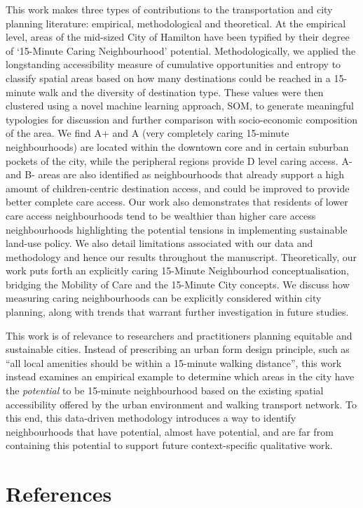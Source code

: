 \documentclass[
  authoryear,
  preprint,
  3p]{elsarticle}
\begin{document}
This work makes three types of contributions to the transportation and
city planning literature: empirical, methodological and theoretical. At
the empirical level, areas of the mid-sized City of Hamilton have been
typified by their degree of `15-Minute Caring Neighbourhood' potential.
Methodologically, we applied the longstanding accessibility measure of
cumulative opportunities and entropy to classify spatial areas based on
how many destinations could be reached in a 15-minute walk and the
diversity of destination type. These values were then clustered using a
novel machine learning approach, SOM, to generate meaningful typologies
for discussion and further comparison with socio-economic composition of
the area. We find A+ and A (very completely caring 15-minute
neighbourhoods) are located within the downtown core and in certain
suburban pockets of the city, while the peripheral regions provide D
level caring access. A- and B- areas are also identified as
neighbourhoods that already support a high amount of children-centric
destination access, and could be improved to provide better complete
care access. Our work also demonstrates that residents of lower care
access neighbourhoods tend to be wealthier than higher care access
neighbourhoods highlighting the potential tensions in implementing
sustainable land-use policy. We also detail limitations associated with
our data and methodology and hence our results throughout the
manuscript. Theoretically, our work puts forth an explicitly caring
15-Minute Neighbourhod conceptualisation, bridging the Mobility of Care
and the 15-Minute City concepts. We discuss how measuring caring
neighbourhoods can be explicitly considered within city planning, along
with trends that warrant further investigation in future studies.

This work is of relevance to researchers and practitioners planning
equitable and sustainable cities. Instead of prescribing an urban form
design principle, such as ``all local amenities should be within a
15-minute walking distance'', this work instead examines an empirical
example to determine which areas in the city have the \emph{potential}
to be 15-minute neighbourhood based on the existing spatial
accessibility offered by the urban environment and walking transport
network. To this end, this data-driven methodology introduces a way to
identify neighbourhoods that have potential, almost have potential, and
are far from containing this potential to support future
context-specific qualitative work.

\section{References}\label{references}

\renewcommand{\bibsection}{}

\end{document}
